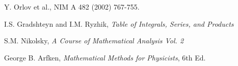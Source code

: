 \begin{thebibliography}{}

Y. Orlov et al., NIM A 482 (2002) 767-755.

I.S. Gradshteyn and I.M. Ryzhik, \textit{Table of Integrals, Series, and Products}

S.M. Nikolsky, \textit{A Course of Mathematical Analysis Vol. 2} 

George B. Arfken, \textit{Mathematical Methods for Physicists}, 6th Ed.

\end{thebibliography}
